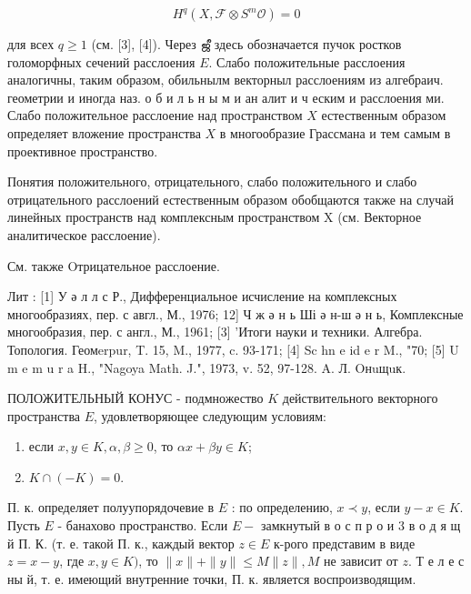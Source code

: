 \documentclass[10pt]{article}
\begin{document}
\[

H^{q}\left(X, \mathscr{F} \otimes S^{m} \mathscr{O}\right)=0

\]



для всех $q \geqslant 1$ (см. [3], [4]). Через ஜீ здесь обозначается пучок ростков голоморфных сечений расслоения $E$. Слабо положительные расслоения аналогичны, таким образом, обильнылм векторныл расслоениям из алгебраич. геометрии и иногда наз. о б и л ь н ы м и ан алит и ч еским и расслоения ми. Слабо положительное расслоение над пространством $X$ естественным образом определяет вложение пространства $X$ в многообразие Грассмана и тем самым в проективное пространство.



Понятия положительного, отрицательного, слабо положительного и слабо отрицательного расслоений естественным образом обобщаются также на случай линейных пространств над комплексным пространством X (см. Векторное аналитическое расслоение).



См. также Oтрицательное расслоение.



Лит : [1] У ә л л с Р., Дифференциальное исчисление на комплексных многообразиях, пер. с авгл., М., 1976; 12] Ч ж ә н ь Ші ә н-ш ә н ь, Комплексные многообразия, пер. с англ., М., 1961; [3] 'Итоги науки и техники. Алгебра. Топология. Геомerpur, T. 15, M., 1977, c. 93-171; [4] Sc hn e id e r M., "70; [5] U m e m u r a H., "Nagoya Math. J.", 1973, v. 52, 97-128. A. Л. Oнuщuк.



ПОЛОЖИТЕЛЬНЫЙ КОНУС - подмножество $K$ действительного векторного пространства $E$, удовлетворяющее следующим условиям:



\begin{enumerate}

  \item если $x, y \in K, \alpha, \beta \geqslant 0$, то $\alpha x+\beta y \in K$;



  \item $K \cap(-K)=0$.



\end{enumerate}



П. к. определяет полуупорядочевие в $E$ : по определению, $x \prec y$, если $y-x \in K$. Пусть $E$ - банахово пространство. Если $E-$ замкнутый в о с п р о и 3 в о д я щ й П. К. (т. е. такой П. к., каждый вектор $z \in E$ к-рого представим в виде $z=x-y$, где $x, y \in K)$, то $\|x\|+\|y\| \leqslant M\|z\|, M$ не зависит от $z$. Т е л е с ны й, т. е. имеющий внутренние точки, П. к. является воспроизводящим.
\end{document}

